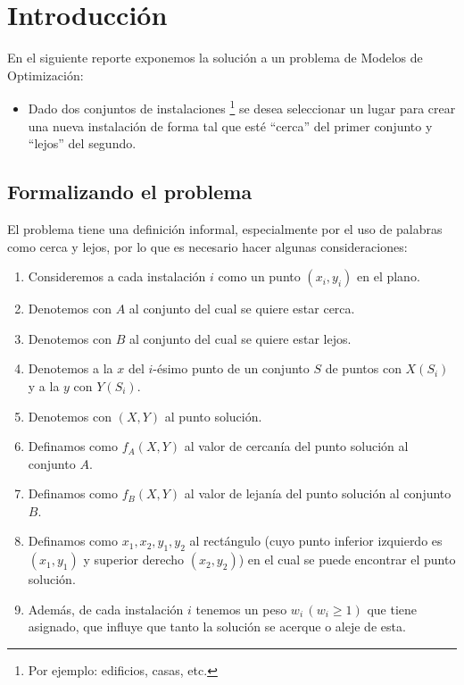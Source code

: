 \section{Introducción}

En el siguiente reporte exponemos la solución a un problema de Modelos de Optimización:

\begin{itemize}[label=\textbullet]
    \item Dado dos conjuntos de instalaciones \footnote{Por ejemplo: edificios, casas, etc.} se desea seleccionar un lugar para crear una nueva instalación de forma tal que esté ``cerca'' del primer conjunto y ``lejos'' del segundo.
\end{itemize}

\subsection{Formalizando el problema}

El problema tiene una definición informal, especialmente por el uso de palabras como cerca y lejos, por lo que es necesario hacer algunas consideraciones:

\begin{enumerate}
    \item Consideremos a cada instalación $i$ como un punto $(x_i, y_i)$ en el plano.
    \item Denotemos con $A$ al conjunto del cual se quiere estar cerca.
    \item Denotemos con $B$ al conjunto del cual se quiere estar lejos.
    \item Denotemos a la $x$ del $i$-ésimo punto de un conjunto $S$ de puntos con $X(S_i)$ y a la $y$ con $Y(S_i)$.
    \item Denotemos con $(X, Y)$ al punto solución.
    \item Definamos como $f_A(X, Y)$ al valor de cercanía del punto solución al conjunto $A$.
    \item Definamos como $f_B(X, Y)$ al valor de lejanía del punto solución al conjunto $B$.
    \item Definamos como $x_1, x_2, y_1, y_2$ al rectángulo (cuyo punto inferior izquierdo es $(x_1, y_1)$ y superior derecho $(x_2, y_2)$) en el cual se puede encontrar el punto solución.
    \item Además, de cada instalación $i$ tenemos un peso $w_i \, (w_i \ge 1)$ que tiene asignado, que influye que tanto la solución se acerque o aleje de esta.
\end{enumerate}

